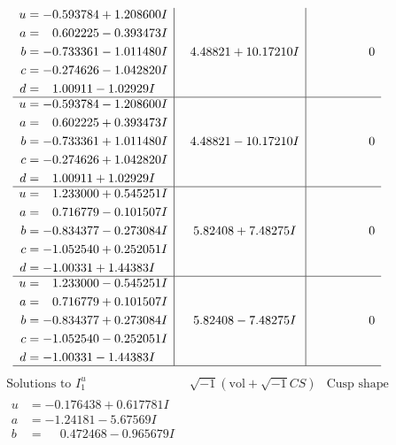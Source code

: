 \documentclass[1p]{elsarticle_modified}
\theoremstyle{definition}
\newcommand{\I}{\sqrt{-1}}
\begin{document}
$$\begin{array}{c|c|c}
\begin{aligned}
u &= -0.593784 + 1.208600 I \\
a &= \phantom{-}0.602225 - 0.393473 I \\
b &= -0.733361 - 1.011480 I \\
c &= -0.274626 - 1.042820 I \\
d &= \phantom{-}1.00911 - 1.02929 I\end{aligned}
 & \phantom{-}4.48821 + 10.17210 I & \phantom{-0.000000 } 0 \\ \hline\begin{aligned}
u &= -0.593784 - 1.208600 I \\
a &= \phantom{-}0.602225 + 0.393473 I \\
b &= -0.733361 + 1.011480 I \\
c &= -0.274626 + 1.042820 I \\
d &= \phantom{-}1.00911 + 1.02929 I\end{aligned}
 & \phantom{-}4.48821 - 10.17210 I & \phantom{-0.000000 } 0 \\ \hline\begin{aligned}
u &= \phantom{-}1.233000 + 0.545251 I \\
a &= \phantom{-}0.716779 - 0.101507 I \\
b &= -0.834377 - 0.273084 I \\
c &= -1.052540 + 0.252051 I \\
d &= -1.00331 + 1.44383 I\end{aligned}
 & \phantom{-}5.82408 + 7.48275 I & \phantom{-0.000000 } 0 \\ \hline\begin{aligned}
u &= \phantom{-}1.233000 - 0.545251 I \\
a &= \phantom{-}0.716779 + 0.101507 I \\
b &= -0.834377 + 0.273084 I \\
c &= -1.052540 - 0.252051 I \\
d &= -1.00331 - 1.44383 I\end{aligned}
 & \phantom{-}5.82408 - 7.48275 I & \phantom{-0.000000 } 0\\
 \hline 
 \end{array}$$\newpage$$\begin{array}{c|c|c}  
\text{Solutions to }I^u_{1}& \I (\text{vol} + \sqrt{-1}CS) & \text{Cusp shape}\\
 \hline 
\begin{aligned}
u &= -0.176438 + 0.617781 I \\
a &= -1.24181 - 5.67569 I \\
b &= \phantom{-}0.472468 - 0.965679 I \\

\end{aligned}
\end{array}$$
\end{document}

